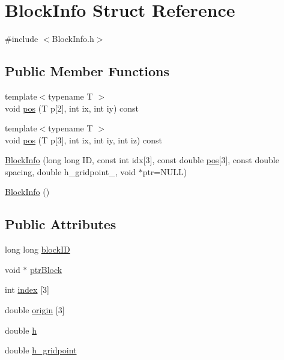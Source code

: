 \hypertarget{struct_block_info}{}\section{Block\+Info Struct Reference}
\label{struct_block_info}


{\ttfamily \#include $<$Block\+Info.\+h$>$}

\subsection*{Public Member Functions}
\begin{DoxyCompactItemize}
\item 
{\footnotesize template$<$typename T $>$ }\\void \hyperlink{struct_block_info_abcc226bdb973d09286902ae23f3962fd}{pos} (T p\mbox{[}2\mbox{]}, int ix, int iy) const 
\item 
{\footnotesize template$<$typename T $>$ }\\void \hyperlink{struct_block_info_a803920cf6f3185de720fe789fa59f6cb}{pos} (T p\mbox{[}3\mbox{]}, int ix, int iy, int iz) const 
\item 
\hyperlink{struct_block_info_a02f86d450ef17d29635aa21622b641df}{Block\+Info} (long long I\+D, const int idx\mbox{[}3\mbox{]}, const double \hyperlink{struct_block_info_abcc226bdb973d09286902ae23f3962fd}{pos}\mbox{[}3\mbox{]}, const double spacing, double h\+\_\+gridpoint\+\_\+, void $\ast$ptr=N\+U\+L\+L)
\item 
\hyperlink{struct_block_info_a6b27ee44e1fa4f1b7eddb1f2e9dcaba7}{Block\+Info} ()
\end{DoxyCompactItemize}
\subsection*{Public Attributes}
\begin{DoxyCompactItemize}
\item 
long long \hyperlink{struct_block_info_aff4a50657c14cc550c9e0e3aaaed1a15}{block\+I\+D}
\item 
void $\ast$ \hyperlink{struct_block_info_af3655416c17becfb24a9f475a7b97d23}{ptr\+Block}
\item 
int \hyperlink{struct_block_info_ad32832aaa2dee35464a74abfae741572}{index} \mbox{[}3\mbox{]}
\item 
double \hyperlink{struct_block_info_a8d2d03097cfbffc58d3cc2dee371e4b2}{origin} \mbox{[}3\mbox{]}
\item 
double \hyperlink{struct_block_info_abb250cd39311bd0a840588ff2a6196ad}{h}
\item 
double \hyperlink{struct_block_info_a83bd46701539e64d666206d6501ee3ea}{h\+\_\+gridpoint}
\end{DoxyCompactItemize}


